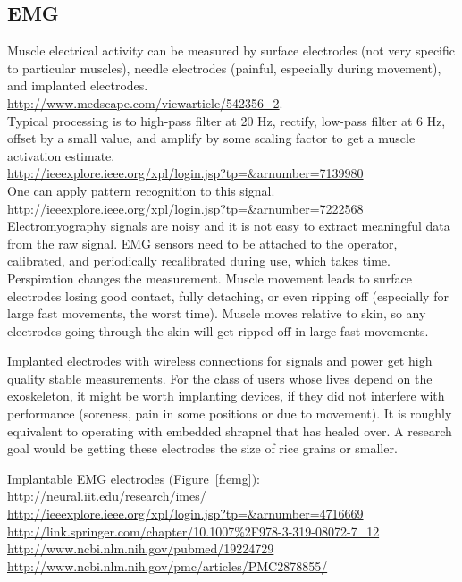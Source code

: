 \documentclass[letterpaper,12pt,fullpage]{article}
\begin{document}
\subsection{EMG}

Muscle electrical activity can be measured by surface electrodes
(not very specific to particular muscles), needle electrodes (painful,
especially during movement), and implanted electrodes.\\
\url{http://www.medscape.com/viewarticle/542356_2}.\\
Typical processing is to 
high-pass filter at 20 Hz, rectify, low-pass filter at 6 Hz,
offset by a small value, and amplify by some scaling factor
to get a muscle activation estimate.\\
\url{http://ieeexplore.ieee.org/xpl/login.jsp?tp=&arnumber=7139980}\\
One can apply pattern recognition to this signal.\\
\url{http://ieeexplore.ieee.org/xpl/login.jsp?tp=&arnumber=7222568}\\

Electromyography 
signals are noisy and it is not easy to extract
meaningful data from the raw signal. 
EMG sensors
need to be attached to the operator, calibrated,
and periodically recalibrated during use, which takes time.
Perspiration changes the measurement. 
Muscle movement leads to surface electrodes losing good contact,
fully detaching, or
even ripping off (especially for large fast
movements, the worst time). Muscle moves relative to skin,
so any electrodes going through the skin will get ripped off
in large fast movements. 

Implanted electrodes
with wireless connections for signals and power
get high quality stable measurements.
For the class of users whose lives depend on the exoskeleton,
it might be worth implanting devices, if they did not interfere
with performance (soreness, pain in some positions or due to
movement). It is roughly equivalent to
operating with embedded shrapnel that has healed over.
A research goal would be getting these electrodes the size of rice
grains or smaller.

Implantable EMG electrodes (Figure~\ref{f:emg}):\\
\url{http://neural.iit.edu/research/imes/}\\
\url{http://ieeexplore.ieee.org/xpl/login.jsp?tp=&arnumber=4716669}\\
\url{http://link.springer.com/chapter/10.1007\%2F978-3-319-08072-7_12}\\
\url{http://www.ncbi.nlm.nih.gov/pubmed/19224729}\\
\url{http://www.ncbi.nlm.nih.gov/pmc/articles/PMC2878855/}\\
\end{document}
